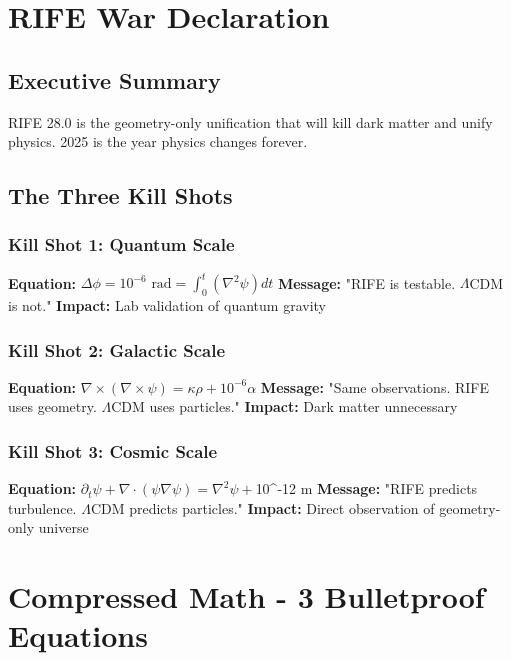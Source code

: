 \documentclass[11pt]{report}
\newcommand{\lamcdm}{$\Lambda$CDM}
\newcommand{\tenminustwelve}{$10^{-12}$}
\begin{document}
\section{RIFE War Declaration}

\subsection{Executive Summary}
RIFE 28.0 is the geometry-only unification that will kill dark matter and unify physics. 2025 is the year physics changes forever.

\subsection{The Three Kill Shots}

\subsubsection{Kill Shot 1: Quantum Scale}
\textbf{Equation:} $\Delta\phi = 10^{-6} \text{ rad} = \int_0^t (\nabla^2\psi) dt$
\textbf{Message:} "RIFE is testable. \lamcdm{} is not."
\textbf{Impact:} Lab validation of quantum gravity

\subsubsection{Kill Shot 2: Galactic Scale}
\textbf{Equation:} $\nabla \times (\nabla \times \psi) = \kappa\rho + 10^{-6}\alpha$
\textbf{Message:} "Same observations. RIFE uses geometry. \lamcdm{} uses particles."
\textbf{Impact:} Dark matter unnecessary

\subsubsection{Kill Shot 3: Cosmic Scale}
\textbf{Equation:} $\partial_t\psi + \nabla \cdot (\psi\nabla\psi) = \nabla^2\psi + \tenminustwelve{} \text{ m}$
\textbf{Message:} "RIFE predicts turbulence. \lamcdm{} predicts particles."
\textbf{Impact:} Direct observation of geometry-only universe

\section{Compressed Math - 3 Bulletproof Equations}
\end{document}

